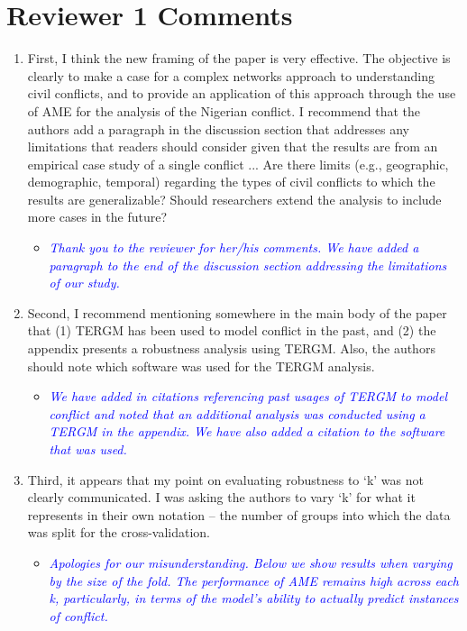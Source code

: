 \section*{Reviewer 1 Comments}

\begin{enumerate}
	\item First, I think the new framing of the paper is very effective. The objective is clearly to make a case for a complex networks approach to understanding civil conflicts, and to provide an application of this approach through the use of AME for the analysis of the Nigerian conflict. I recommend that the authors add a paragraph in the discussion section that addresses any limitations that readers should consider given that the results are from an empirical case study of a single conflict ... Are there limits (e.g., geographic, demographic, temporal) regarding the types of civil conflicts to which the results are generalizable? Should researchers extend the analysis to include more cases in the future?
	\begin{itemize}
		\item \textcolor{blue}{ \emph{
		Thank you to the reviewer for her/his comments. We have added a paragraph to the end of the discussion section addressing the limitations of our study. 
		}}
	\end{itemize}	
	\item Second, I recommend mentioning somewhere in the main body of the paper that (1) TERGM has been used to model conflict in the past, and (2) the appendix presents a robustness analysis using TERGM. Also, the authors should note which software was used for the TERGM analysis.
	\begin{itemize}
		\item \textcolor{blue}{ \emph{
		We have added in citations referencing past usages of TERGM to model conflict and noted that an additional analysis was conducted using a TERGM in the appendix. We have also added a citation to the software that was used.
		}}
	\end{itemize}
	\item Third, it appears that my point on evaluating robustness to `k' was not clearly communicated. I was asking the authors to vary `k' for what it represents in their own notation -- the number of groups into which the data was split for the cross-validation.
	\begin{itemize}
		\item \textcolor{blue}{ \emph{
		Apologies for our misunderstanding. Below we show results when varying by the size of the fold. The performance of AME remains high across each k, particularly, in terms of the model's ability to actually predict instances of conflict.
}}
\end{itemize}
\end{enumerate}
